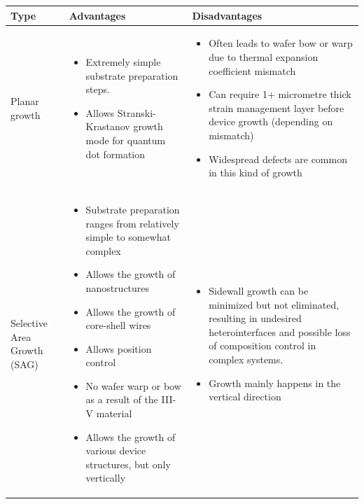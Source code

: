 \begin{table}
    \centering
\begin{longtable}{p{}|p{}|p{}}
    Type & Advantages & Disadvantages \\ \hline \hline
    Planar growth & 
    \begin{itemize}
        \item Extremely simple substrate preparation steps.
        \item Allows Stranski-Krastanov growth mode for quantum dot formation \cite{Shi2016, Reithmaier2016}
    \end{itemize} & 
    \begin{itemize}
        \item Often leads to wafer bow or warp due to thermal expansion coefficient mismatch \cite{Miyoshi2016, Wang2017_2}
        \item Can require 1+ micrometre thick strain management layer before device growth (depending on mismatch) \cite{Wang2017_2, Cantoro2012}
        \item Widespread defects are common in this kind of growth \cite{Ravash2012}
    \end{itemize} \\ \hline
    Selective Area Growth (SAG) & 
    \begin{itemize}
        \item Substrate preparation ranges from relatively simple to somewhat complex
        \item Allows the growth of nanostructures \cite{Cantoro2012}
        \item Allows the growth of core-shell wires \cite{Tomioka2011}
        \item Allows position control \cite{Tomioka2011}
        \item No wafer warp or bow as a result of the III-V material
        \item Allows the growth of various device structures, but only vertically \cite{Bi2019, Staudinger2021}
    \end{itemize}  & 
    \begin{itemize}
        \item Sidewall growth can be minimized but not eliminated, resulting in undesired heterointerfaces and possible loss of composition control in complex systems.
        \item Growth mainly happens in the vertical direction
    \end{itemize}  \\ \hline

\end{longtable}
\end{table}
